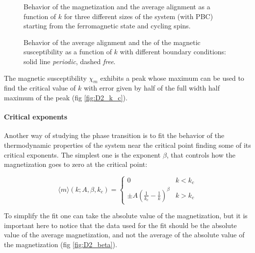 \documentclass[a4paper, 11pt]{article}
\begin{document}
      \begin{figure}[H]
        \centering
        \caption{Behavior of the magnetization and the average alignment as a function of $k$ for three different sizes of the system (with PBC) starting from the ferromagnetic state and cycling spins.}
        \label{fig:D2_size_dependent}
      \end{figure}

      \begin{figure}
        \centering
        \caption{Behavior of the average alignment and the of the magnetic susceptibility as a function of $k$ with different boundary conditions: solid line \emph{periodic}, dashed \emph{free}.}
        \label{fig:D2_achi}
      \end{figure}

      The magnetic susceptibility $\chi_m$ exhibits a peak whose maximum can be used to find the critical value of $k$ with error given by half of the full width half maximum of the peak (fig \ref{fig:D2_k_c}).

      \paragraph{Critical exponents}
      Another way of studying the phase transition is to fit the behavior of the thermodynamic properties of the system near the critical point finding some of its critical exponents.
      The simplest one is the exponent $\beta$, that controls how the magnetization goes to zero at the critical point:

      \begin{equation}
        \langle m \rangle (k;A,\beta,k_c) = \begin{cases}
          0 & k < k_c \\
          \pm A \left(\frac{1}{k_c} - \frac{1}{k} \right)^\beta & k > k_c
        \end{cases}
      \end{equation}

      To simplify the fit one can take the absolute value of the magnetization, but it is important here to notice that the data used for the fit should be the absolute value of the average magnetization, and not the average of the absolute value of the magnetization (fig \ref{fig:D2_beta}).
\end{document}
